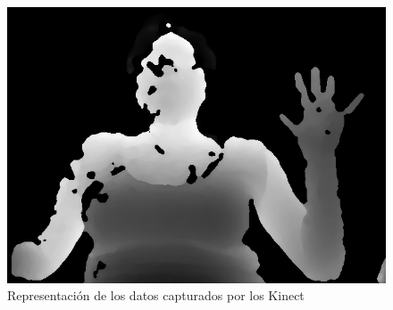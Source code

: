 \begin{figure}[!h]
\begin{center}
\includegraphics[scale=.5]{./Figures/166_W13.png}
\end{center}
\caption{Representación de los datos capturados por los Kinect}
\label{fig:ImagenCapturadaNoNoise}
\end{figure}  
  

